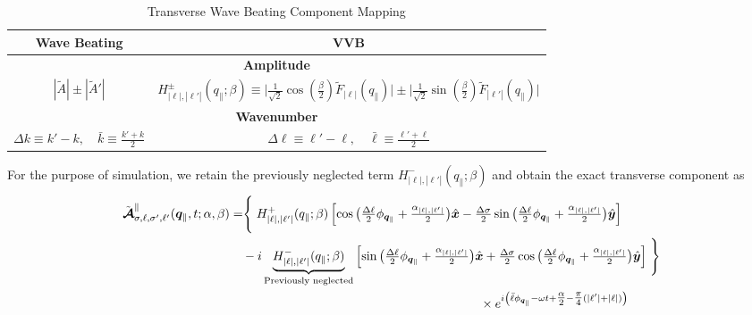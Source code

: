 \clearpage
\begin{table}[H]
\centering
\caption{Transverse Wave Beating Component Mapping}
\label{tab:variable_mapping_transverse}

\setlength{\tabcolsep}{3pt}
\renewcommand{\arraystretch}{1.1}

\begin{tabular}{|c|c|}
\hline
\rule[-0.6ex]{0pt}{2.8ex}\textbf{Wave Beating} & \textbf{VVB} \\ \hline

\multicolumn{2}{|c|}{\rule[-0.5ex]{0pt}{2.5ex}\textbf{Amplitude}} \\ \hline
\rule[-2.5ex]{0pt}{6.2ex}
$|\tilde{A}| \pm |\tilde{A}'|$ 
  & $H_{|\ell|,|\ell'|}^{\pm}(q_{\|}; \beta) \equiv \Big| \tfrac{1}{\sqrt{2}} \cos\left(\tfrac{\beta}{2}\right) \tilde{F}_{|\ell|}(q_{\|}) \Big| \pm \Big| \tfrac{1}{\sqrt{2}} \sin\left(\tfrac{\beta}{2}\right) \tilde{F}_{|\ell'|}(q_{\|}) \Big|$ \\ \hline

\multicolumn{2}{|c|}{\rule[-0.5ex]{0pt}{2.5ex}\textbf{Wavenumber}} \\ \hline
\rule[-1.5ex]{0pt}{4.2ex}
$\Delta k \equiv k' - k, \quad \bar{k} \equiv \tfrac{k' + k}{2}$ 
  & $\Delta \ell \equiv \ell' - \ell, \quad \bar{\ell} \equiv \tfrac{\ell' + \ell}{2}$ \\ \hline

\end{tabular} %
\end{table}
\noindent
For the purpose of simulation, we retain the previously neglected term $H_{|\ell|,|\ell'|}^{-}(q_\parallel; \beta)$ and obtain the exact transverse component as
\begin{equation}
\label{eq:transverse_exact_component}
\begin{aligned}
\tilde{\boldsymbol{\mathcal{A}}}_{\sigma,\ell,\sigma',\ell'}^{\parallel}(\boldsymbol{q}_{\|}, t; \alpha, \beta) 
&= \Biggm\{ H_{|\ell|,|\ell'|}^{+}(q_{\|}; \beta) \left[ \cos \big( \tfrac{\Delta\ell}{2}\phi_{\boldsymbol{q}_{\|}} + \tfrac{\alpha_{|\ell|,|\ell'|}}{2} \big) \hat{\boldsymbol{x}} - \tfrac{\Delta\sigma}{2} \sin \big( \tfrac{\Delta\ell}{2}\phi_{\boldsymbol{q}_{\|}} + \tfrac{\alpha_{|\ell|,|\ell'|}}{2} \big) \hat{\boldsymbol{y}} \right] \\
&\quad - i \underbrace{H_{|\ell|,|\ell'|}^{-}(q_{\|}; \beta)}_{\text{\scriptsize Previously neglected}} \left[ \sin \big( \tfrac{\Delta\ell}{2}\phi_{\boldsymbol{q}_{\|}} + \tfrac{\alpha_{|\ell|,|\ell'|}}{2} \big) \hat{\boldsymbol{x}} + \tfrac{\Delta\sigma}{2} \cos \big( \tfrac{\Delta\ell}{2}\phi_{\boldsymbol{q}_{\|}} + \tfrac{\alpha_{|\ell|,|\ell'|}}{2} \big) \hat{\boldsymbol{y}} \right] \Biggm\} \\
&\hspace{20em} \times e^{i \left( \bar{\ell}\phi_{\boldsymbol{q}_{\|}} - \omega t + \tfrac{\alpha}{2} - \tfrac{\pi}{4}(|\ell'| + |\ell|) \right)}
\end{aligned}
\end{equation}
